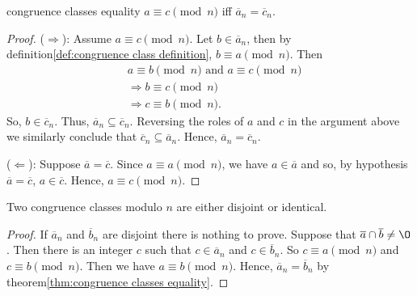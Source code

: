 \begin{theorem}{}{congruence classes equality}
    $a\equiv c\pmod n$ iff $\overline{a}_n=\overline{c}_n$.
\end{theorem}
\begin{proof}
    ($\Rightarrow$): Assume $a\equiv c\pmod n$. Let $b\in \overline{a}_n$, then by definition\ref{def:congruence class definition}, $b\equiv a\pmod n$. Then
    \begin{align*}
        & a\equiv b\pmod n \text{ and } a\equiv c\pmod n\\
        &\Rightarrow b\equiv c\pmod n\\
        &\Rightarrow c\equiv b\pmod n.
    \end{align*}
So, $b\in \overline{c}_n$. Thus, $\overline{a}_n\subseteq \overline{c}_n$. 
Reversing the roles of $a$ and $c$ in the
argument above we similarly conclude that $\overline{c}_n\subseteq \overline{a}_n$.
Hence, $\overline{a}_n=\overline{c}_n$.

($\Leftarrow$): Suppose $\overline{a}=\overline{c}$. Since $a\equiv a\pmod n$, we have $a\in\overline{a}$ and so, by hypothesis $\overline{a}=\overline{c}$, $a\in\overline{c}$. Hence, 
$a\equiv c\pmod n$.
\end{proof}

\begin{corollary}{}{}
    Two congruence classes modulo $n$ are either disjoint or identical.
\end{corollary}
\begin{proof}
    If $\overline{a}_n$ and $\overline{b}_n$ are disjoint there is nothing to prove. Suppose that $\overline{a}\cap \overline{b}\neq \O$. 
    Then there is an integer $c$ such that $c\in\overline{a}_n$ and $c \in \overline{b}_n$. So $c\equiv a\pmod n$ and $c\equiv b\pmod n$. Then we have
    $a\equiv b\pmod n$.
    Hence, $\overline{a}_n=\overline{b}_n$ by theorem\ref{thm:congruence classes equality}.
\end{proof}

